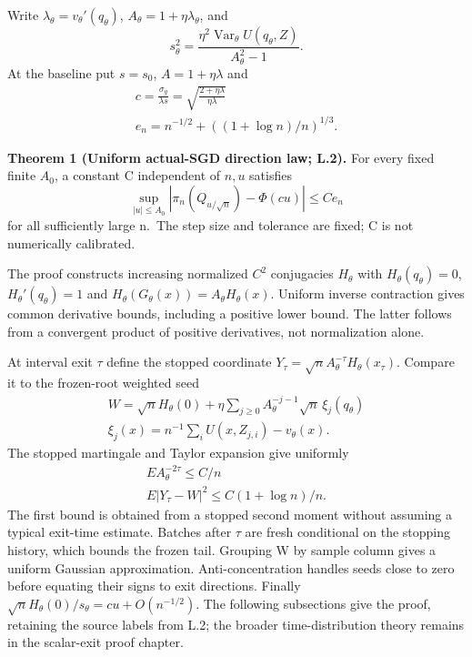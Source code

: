 Write \(\lambda_\theta=v_\theta'(q_\theta)\), \(A_\theta=1+\eta\lambda_\theta\), and
\[
s_\theta^2=\frac{\eta^2\operatorname{Var}_\theta U(q_\theta,Z)}{A_\theta^2-1}.
\]
At the baseline put \(s=s_0\), \(A=1+\eta\lambda\) and
\[
\begin{gathered}
c=\frac{\sigma_g}{\lambda s}=\sqrt{\frac{2+\eta\lambda}{\eta\lambda}} \\
e_n=n^{-1/2}+((1+\log n)/n)^{1/3}.
\end{gathered}
\]

\textbf{Theorem 1 (Uniform actual-SGD direction law; L.2).} For every fixed finite \(A_0\), a constant C independent of \(n,u\) satisfies
\[
\sup_{|u|\le A_0}|\pi_n(Q_{u/\sqrt n})-\Phi(cu)|\le Ce_n
\]
for all sufficiently large n.~The step size and tolerance are fixed; C is not numerically calibrated.

The proof constructs increasing normalized \(C^2\) conjugacies \(H_\theta\) with \(H_\theta(q_\theta)=0\), \(H_\theta'(q_\theta)=1\) and \(H_\theta(G_\theta(x))=A_\theta H_\theta(x)\). Uniform inverse contraction gives common derivative bounds, including a positive lower bound. The latter follows from a convergent product of positive derivatives, not normalization alone.

At interval exit \(\tau\) define the stopped coordinate \(Y_\tau=\sqrt n A_\theta^{-\tau}H_\theta(x_\tau)\). Compare it to the frozen-root weighted seed
\[
\begin{gathered}
W=\sqrt n H_\theta(0)+\eta\sum_{j\ge0}A_\theta^{-j-1}\sqrt n\,\xi_j(q_\theta) \\
\xi_j(x)=n^{-1}\sum_i U(x,Z_{j,i})-v_\theta(x).
\end{gathered}
\]
The stopped martingale and Taylor expansion give uniformly
\[
\begin{gathered}
E A_\theta^{-2\tau}\le C/n \\
E|Y_\tau-W|^2\le C(1+\log n)/n.
\end{gathered}
\]
The first bound is obtained from a stopped second moment without assuming a typical exit-time estimate. Batches after \(\tau\) are fresh conditional on the stopping history, which bounds the frozen tail. Grouping W by sample column gives a uniform Gaussian approximation. Anti-concentration handles seeds close to zero before equating their signs to exit directions. Finally \(\sqrt n H_\theta(0)/s_\theta=cu+O(n^{-1/2})\). The following subsections give the proof, retaining the source labels from L.2; the broader time-distribution theory remains in the scalar-exit proof chapter.

